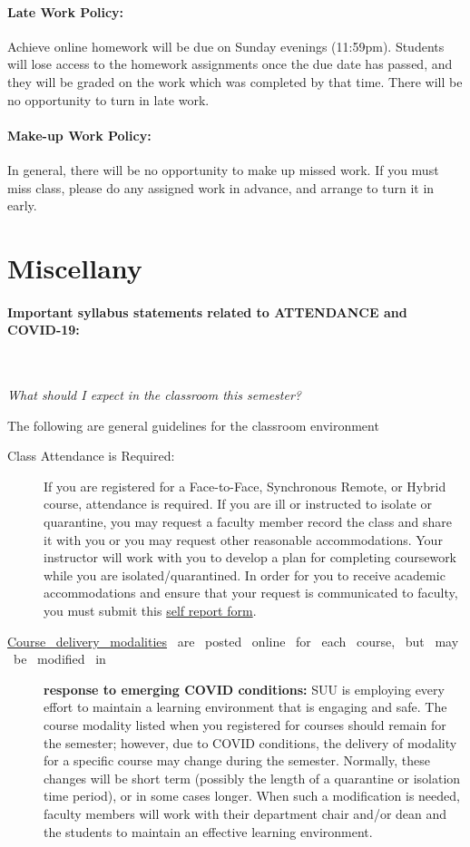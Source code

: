\documentclass[12pt, letterpaper]{article}
\begin{document}
\paragraph{Late Work Policy:}
Achieve online homework will be due on Sunday evenings (11:59pm). Students will lose access to the homework assignments once the due date has passed, and they will be graded on the work which was completed by that time. There will be no opportunity to turn in late work.

\paragraph{Make-up Work Policy:}
In general, there will be no opportunity to make up missed work. If you must miss class, please do any assigned work in advance, and arrange to turn it in early.

\section*{Miscellany}

\paragraph{Important syllabus statements related to ATTENDANCE and COVID-19:} ~

\noindent\emph{What should I expect in the classroom this semester?}

\noindent The following are general guidelines for the classroom environment
\begin{description}
  \item[Class Attendance is Required:] If you are registered for a Face-to-Face, Synchronous Remote, or Hybrid course, attendance is required. If you are ill or instructed to isolate or quarantine, you may request a faculty member record the class and share it with you or you may request other reasonable accommodations. Your instructor will work with you to develop a plan for completing coursework while you are isolated/quarantined. In order for you to receive academic accommodations and ensure that your request is communicated to faculty, you must submit this \href{https://my.suu.edu/covid/selfreport/}{self report form}.
  \item[\href{https://www.suu.edu/registrar/onlinehybrid.html}{Course ~delivery ~modalities} ~are ~posted ~online ~for ~each ~course, ~but ~may ~be ~modified ~in] \textbf{response to emerging COVID conditions:} SUU is employing every effort to maintain a learning environment that is engaging and safe. The course modality listed when you registered for courses should remain for the semester; however, due to COVID conditions, the delivery of modality for a specific course may change during the semester. Normally, these changes will be short term (possibly the length of a quarantine or isolation time period), or in some cases longer. When such a modification is needed, faculty members will work with their department chair and/or dean and the students to maintain an effective learning environment.
\end{description}
\end{document}
